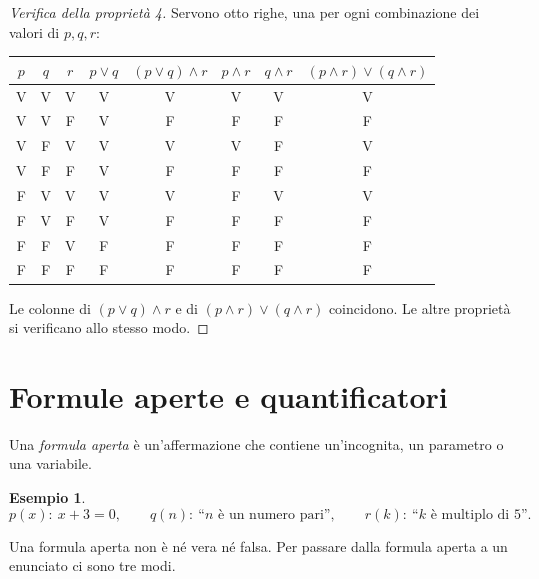 \documentclass[11pt,a4paper]{article}
\theoremstyle{definition}
\newtheorem*{esempio}{Esempio}
\newcommand{\V}{\textsf{V}}
\newcommand{\F}{\textsf{F}}
\begin{document}
\begin{proof}[Verifica della proprietà 4]
Servono otto righe, una per ogni combinazione dei valori di $p, q, r$:
\begin{center}
\begin{tabular}{ccc|c|c|c|c|c}
$p$ & $q$ & $r$ & $p \lor q$ & $(p \lor q) \land r$ & $p \land r$ &
$q \land r$ & $(p \land r) \lor (q \land r)$ \\ \hline
\V & \V & \V & \V & \V & \V & \V & \V \\
\V & \V & \F & \V & \F & \F & \F & \F \\
\V & \F & \V & \V & \V & \V & \F & \V \\
\V & \F & \F & \V & \F & \F & \F & \F \\
\F & \V & \V & \V & \V & \F & \V & \V \\
\F & \V & \F & \V & \F & \F & \F & \F \\
\F & \F & \V & \F & \F & \F & \F & \F \\
\F & \F & \F & \F & \F & \F & \F & \F
\end{tabular}
\end{center}
Le colonne di $(p \lor q) \land r$ e di $(p \land r) \lor (q \land r)$
coincidono. Le altre proprietà si verificano allo stesso modo.
\end{proof}

\section{Formule aperte e quantificatori}

\begin{definizione}
Una \emph{formula aperta} è un'affermazione che contiene un'incognita, un
parametro o una variabile.
\end{definizione}

\begin{esempio}
\[
p(x):\ x + 3 = 0, \qquad
q(n):\ \text{``$n$ è un numero pari''}, \qquad
r(k):\ \text{``$k$ è multiplo di $5$''}.
\]
\end{esempio}

Una formula aperta non è né vera né falsa. Per passare dalla formula aperta
a un enunciato ci sono tre modi.
\end{document}

